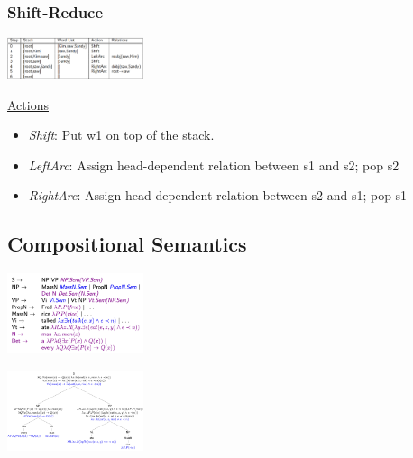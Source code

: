 \documentclass[8pt]{extarticle} %
\begin{document}
\begin{multicols*}{3}
\subsubsection*{Shift-Reduce}
\begin{center}
    \includegraphics[width=0.3\textwidth]{media/shift-reduce.png}
\end{center}

\underline{Actions}
\begin{itemize}[label=\textbullet, labelsep=0.3em, leftmargin=0.5em, itemsep=0em]
    \item \textit{Shift}: Put w1 on top of the stack.
    \item \textit{LeftArc}: Assign head-dependent relation between s1 and s2; pop s2
    \item \textit{RightArc}: Assign head-dependent relation between s2 and s1; pop s1
\end{itemize}

\subsection*{Compositional Semantics}
\begin{center}
    \includegraphics[width=0.3\textwidth]{media/semantic-grammar.png}
\end{center}
\begin{center}
    \includegraphics[width=0.3\textwidth]{media/semantic-tree.png}
\end{center}


\end{multicols*}
\end{document}
